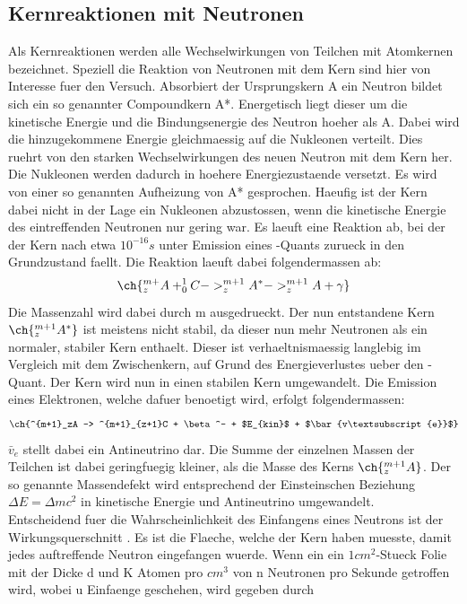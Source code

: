 \documentclass[titlepage=firstcover, captions=tableheading]{scrartcl}
\let\ce\ch
\begin{document}
\subsection{Kernreaktionen mit Neutronen}
Als Kernreaktionen werden alle Wechselwirkungen von Teilchen mit Atomkernen bezeichnet. Speziell die Reaktion von Neutronen mit dem Kern sind hier von Interesse fuer den Versuch. Absorbiert der Ursprungskern A ein Neutron bildet sich ein so genannter Compoundkern A*. Energetisch liegt dieser um die kinetische Energie und die Bindungsenergie des Neutron hoeher als A. Dabei wird die hinzugekommene Energie gleichmaessig auf die Nukleonen verteilt. Dies ruehrt von den starken Wechselwirkungen des neuen Neutron mit dem Kern her. Die Nukleonen werden dadurch in hoehere Energiezustaende versetzt. Es wird von einer so genannten Aufheizung von A* gesprochen. Haeufig ist der Kern dabei nicht in der Lage ein Nukleonen abzustossen, wenn die kinetische Energie des eintreffenden Neutronen nur gering war. Es laeuft eine Reaktion ab, bei der der Kern nach etwa $10^{-16}s$ unter Emission eines \gamma-Quants zurueck in den Grundzustand faellt. Die Reaktion laeuft dabei folgendermassen ab:
\begin{equation}
    \ce{^{m+}_zA + ^{1}_{0}C -> ^{m+1}_zA^{*} -> ^{m+1}_zA + \gamma} \nonumber
\end{equation}
Die Massenzahl wird dabei durch m ausgedrueckt. Der nun entstandene Kern $\ce{^{m+1}_{z}A^{*}}$ ist meistens nicht stabil, da dieser nun mehr Neutronen als ein normaler, stabiler Kern enthaelt. Dieser ist verhaeltnismaessig langlebig im Vergleich mit dem Zwischenkern, auf Grund des Energieverlustes ueber den \gamma-Quant. Der Kern wird nun in einen stabilen Kern umgewandelt. Die Emission eines Elektronen, welche dafuer benoetigt wird, erfolgt folgendermassen:
\begin{equation}
    \ce{^{m+1}_zA -> ^{m+1}_{z+1}C + \beta^- + $E_{kin}$ + $\bar{v\textsubscript{e}}$} \nonumber
\end{equation}
$\bar{v}_e$ stellt dabei ein Antineutrino dar. Die Summe der einzelnen Massen der Teilchen ist dabei geringfuegig kleiner, als die Masse des Kerns $\ce{^{m+1}_zA}$. Der so genannte Massendefekt wird entsprechend der Einsteinschen Beziehung $\Delta E= \Delta mc^{2}$ in kinetische Energie und Antineutrino umgewandelt.\\
Entscheidend fuer die Wahrscheinlichkeit des Einfangens eines Neutrons ist der Wirkungsquerschnitt \sigma. Es ist die Flaeche, welche der Kern haben muesste, damit jedes auftreffende Neutron eingefangen wuerde. Wenn ein ein $1cm^2$-Stueck Folie mit der Dicke d und K Atomen pro $cm^3$ von n Neutronen pro Sekunde getroffen wird, wobei u Einfaenge geschehen, wird \sigma gegeben durch
\end{document}

